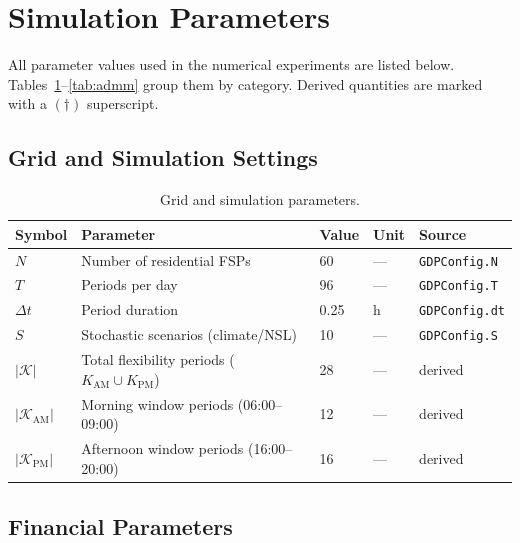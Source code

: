 
\section*{Simulation Parameters}
\label{sec:parameters}

All parameter values used in the numerical experiments are listed below.
Tables~\ref{tab:grid}–\ref{tab:admm} group them by category.
Derived quantities are marked with a $(\dagger)$ superscript.

\subsection*{Grid and Simulation Settings}

\begin{table}[htbp]
\centering
\caption{Grid and simulation parameters.}
\label{tab:grid}
\begin{tabular}{lllll}
\toprule
Symbol & Parameter & Value & Unit & Source \\
\midrule
$N$          & Number of residential FSPs         & 60       & —         & \texttt{GDPConfig.N} \\
$T$          & Periods per day                    & 96       & —         & \texttt{GDPConfig.T} \\
$\Delta t$   & Period duration                    & 0.25     & h         & \texttt{GDPConfig.dt} \\
$S$          & Stochastic scenarios (climate/NSL) & 10       & —         & \texttt{GDPConfig.S} \\
$|\mathcal{K}|$ & Total flexibility periods ($K_\text{AM} \cup K_\text{PM}$) & 28 & — & derived \\
$|\mathcal{K}_\text{AM}|$ & Morning window periods (06:00–09:00) & 12 & — & derived \\
$|\mathcal{K}_\text{PM}|$ & Afternoon window periods (16:00–20:00) & 16 & — & derived \\
\bottomrule
\end{tabular}
\end{table}

\subsection*{Financial Parameters}

